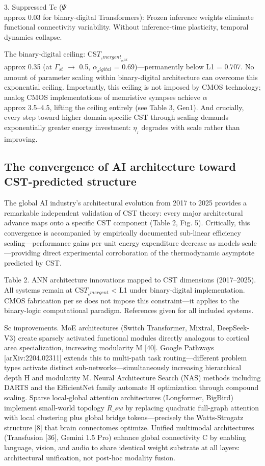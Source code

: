 \documentclass[a4paper,12pt]{article}
\begin{document}
3. Suppressed Tc ($\Psi$  \\approx  0.03 for binary-digital Transformers): Frozen inference weights eliminate functional connectivity variability. Without inference-time plasticity, temporal dynamics collapse.


The binary-digital ceiling: CS$T_{_emergent}_{_max}$  \\approx  0.35 (at $\Gamma_{st}$ $\rightarrow$ 0.5, $\alpha_{_digital}$ = 0.69)---permanently below L1 = 0.707. No amount of parameter scaling within binary-digital architecture can overcome this exponential ceiling. Importantly, this ceiling is not imposed by CMOS technology; analog CMOS implementations of memristive synapses achieve $\alpha$  \\approx  3.5--4.5, lifting the ceiling entirely (see Table 3, Gen1). And crucially, every step toward higher domain-specific CST through scaling demands exponentially greater energy investment: $\eta_{_I}$ degrades with scale rather than improving.



\subsection{The convergence of AI architecture toward CST-predicted structure}

The global AI industry's architectural evolution from 2017 to 2025 provides a remarkable independent validation of CST theory: every major architectural advance maps onto a specific CST component (Table 2, Fig. 5). Critically, this convergence is accompanied by empirically documented sub-linear efficiency scaling---performance gains per unit energy expenditure decrease as models scale---providing direct experimental corroboration of the thermodynamic asymptote predicted by CST.


Table 2. ANN architecture innovations mapped to CST dimensions (2017--2025). All systems remain at CS$T_{_emergent}$ < L1 under binary-digital implementation. CMOS fabrication per se does not impose this constraint---it applies to the binary-logic computational paradigm. References given for all included systems.


Sc improvements. MoE architectures (Switch Transformer, Mixtral, DeepSeek-V3) create sparsely activated functional modules directly analogous to cortical area specialization, increasing modularity M [40]. Google Pathways [arXiv:2204.02311] extends this to multi-path task routing---different problem types activate distinct sub-networks---simultaneously increasing hierarchical depth H and modularity M. Neural Architecture Search (NAS) methods including DARTS and the EfficientNet family automate H optimization through compound scaling. Sparse local-global attention architectures (Longformer, BigBird) implement small-world topology $R\_{sw}$ by replacing quadratic full-graph attention with local clustering plus global bridge tokens---precisely the Watts-Strogatz structure [8] that brain connectomes optimize. Unified multimodal architectures (Transfusion [36], Gemini 1.5 Pro) enhance global connectivity C by enabling language, vision, and audio to share identical weight substrate at all layers: architectural unification, not post-hoc modality fusion.
\end{document}
